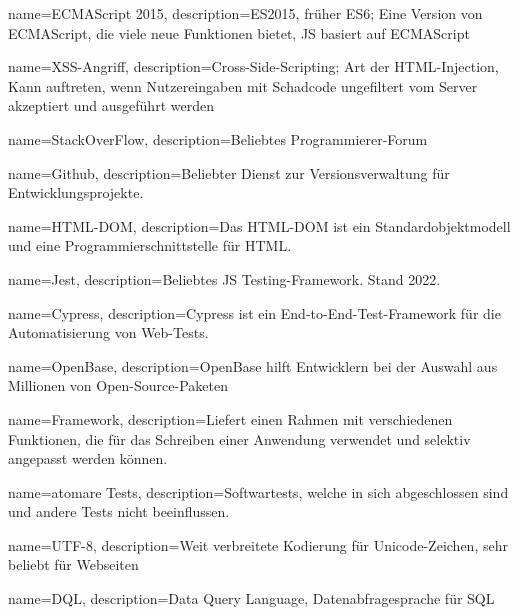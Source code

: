 {
    name=ECMAScript 2015,
    description={ES2015, früher ES6; Eine Version von ECMAScript, die viele neue Funktionen bietet, JS basiert auf ECMAScript}
}

{
    name=XSS-Angriff,
    description={Cross-Side-Scripting; Art der HTML-Injection, Kann auftreten, wenn Nutzereingaben mit Schadcode ungefiltert vom Server akzeptiert und ausgeführt werden}
}

{
    name=StackOverFlow,
    description={Beliebtes Programmierer-Forum}
}

{
    name=Github,
    description={Beliebter Dienst zur Versionsverwaltung für Entwicklungsprojekte.}
}

{
    name=HTML-DOM,
    description={Das HTML-DOM ist ein Standardobjektmodell und eine Programmierschnittstelle für HTML.} 
}

{
    name=Jest,
    description={Beliebtes JS Testing-Framework. Stand 2022.}
}

{
    name=Cypress,
    description={Cypress ist ein End-to-End-Test-Framework für die Automatisierung von Web-Tests.} 
}

{
    name=OpenBase,
    description={OpenBase hilft Entwicklern bei der Auswahl aus Millionen von Open-Source-Paketen} 
}

{
    name=Framework,
    description={Liefert einen Rahmen mit verschiedenen Funktionen, die für das Schreiben einer Anwendung verwendet und selektiv angepasst werden können.}
}

{
    name=atomare Tests,
    description={Softwartests, welche in sich abgeschlossen sind und andere Tests nicht beeinflussen.}
}

{
    name=UTF-8,
    description={Weit verbreitete Kodierung für Unicode-Zeichen, sehr beliebt für Webseiten}
}

{
    name=DQL,
    description={Data Query Language, Datenabfragesprache für SQL}
}

